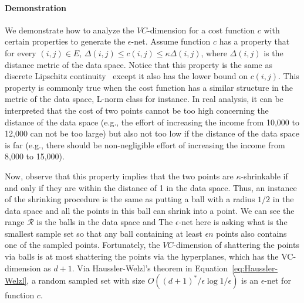 \paragraph{Demonstration}
We demonstrate how to analyze the $VC$-dimension for a cost function $c$ with certain properties to generate the $\epsilon$-net. Assume function $c$ has a property that for every $(i,j) \in E$,  $\Delta(i,j) \leq c(i,j) \leq \kappa \Delta(i,j)$, where $\Delta(i,j)$ is the distance metric of the data space. Notice that this property is the same as discrete Lipschitz continuity~\cite{jiang2011free} except it also has the lower bound on $c(i,j)$. This property is commonly true when the cost function has a similar structure in the metric of the data space, L-norm class for instance. In real analysis, it can be interpreted that the cost of two points cannot be too high concerning the distance of the data space (e.g., the effort of increasing the income from 10,000 to 12,000 can not be too large) but also not too low if the distance of the data space is far (e.g., there should be non-negligible effort of increasing the income from 8,000 to 15,000). 

Now, observe that this property implies that the two points are $\kappa$-shrinkable if and only if they are within the distance of 1 in the data space. Thus, an instance of the shrinking procedure is the same as putting a ball with a radius $1/2$ in the data space and all the points in this ball can shrink into a point. We can see the range $\mathcal{R}$ is the balls in the data space and The $\epsilon$-net here is asking what is the smallest sample set so that any ball containing at least $\epsilon n$ points also contains one of the sampled points. Fortunately, the $VC$-dimension of shattering the points via balls is at most shattering the points via the hyperplanes, which has the VC-dimension as $d+1$. Via Haussler-Welzl's theorem in Equation~\ref{eq:Haussler-Welzl}, a random sampled set with size $O( (d+1)^*/\epsilon \log 1/\epsilon)$ is an $\epsilon$-net for function $c$.  